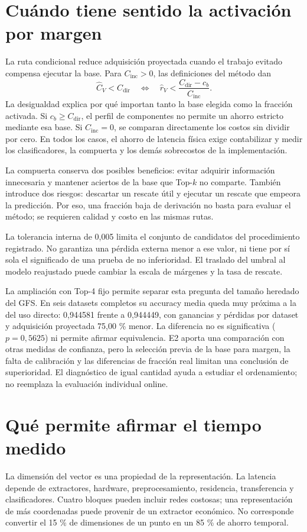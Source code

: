 \section{Cuándo tiene sentido la activación por margen}
La ruta condicional reduce adquisición proyectada cuando el trabajo evitado compensa ejecutar la base. Para \(C_{\mathrm{inc}}>0\), las definiciones del método dan
\begin{equation}
\widehat C_V<C_{\mathrm{dir}}
\quad\Longleftrightarrow\quad
\widehat r_V<\frac{C_{\mathrm{dir}}-c_b}{C_{\mathrm{inc}}}.
\end{equation}
La desigualdad explica por qué importan tanto la base elegida como la fracción activada. Si \(c_b\geq C_{\mathrm{dir}}\), el perfil de componentes no permite un ahorro estricto mediante esa base. Si \(C_{\mathrm{inc}}=0\), se comparan directamente los costos sin dividir por cero. En todos los casos, el ahorro de latencia física exige contabilizar y medir los clasificadores, la compuerta y los demás sobrecostos de la implementación.

La compuerta conserva dos posibles beneficios: evitar adquirir información innecesaria y mantener aciertos de la base que Top-\(k\) no comparte. También introduce dos riesgos: descartar un rescate útil y ejecutar un rescate que empeora la predicción. Por eso, una fracción baja de derivación no basta para evaluar el método; se requieren calidad y costo en las mismas rutas.

La tolerancia interna de 0,005 limita el conjunto de candidatos del procedimiento registrado. No garantiza una pérdida externa menor a ese valor, ni tiene por sí sola el significado de una prueba de no inferioridad. El traslado del umbral al modelo reajustado puede cambiar la escala de márgenes y la tasa de rescate.

La ampliación con Top-4 fijo permite separar esta pregunta del tamaño heredado del GFS. En seis datasets completos su accuracy media queda muy próxima a la del uso directo: 0,944581 frente a 0,944449, con ganancias y pérdidas por dataset y adquisición proyectada 75,00 \% menor. La diferencia no es significativa (\(p=0,5625\)) ni permite afirmar equivalencia. E2 aporta una comparación con otras medidas de confianza, pero la selección previa de la base para margen, la falta de calibración y las diferencias de fracción real limitan una conclusión de superioridad. El diagnóstico de igual cantidad ayuda a estudiar el ordenamiento; no reemplaza la evaluación individual online.

\section{Qué permite afirmar el tiempo medido}
La dimensión del vector es una propiedad de la representación. La latencia depende de extractores, hardware, preprocesamiento, residencia, transferencia y clasificadores. Cuatro bloques pueden incluir redes costosas; una representación de más coordenadas puede provenir de un extractor económico. No corresponde convertir el 15 \% de dimensiones de un punto en un 85 \% de ahorro temporal.

